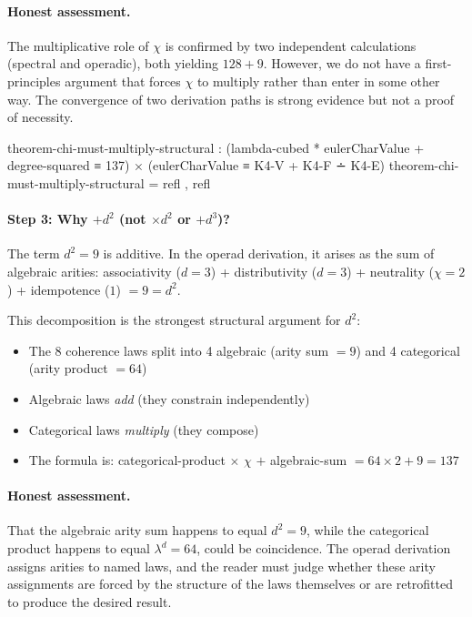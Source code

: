 \documentclass[11pt,a4paper]{book}
\begin{document}
\paragraph{Honest assessment.} The multiplicative role of $\chi$ is confirmed by
two independent calculations (spectral and operadic), both yielding $128 + 9$.
However, we do not have a first-principles argument that forces $\chi$ to multiply
rather than enter in some other way. The convergence of two derivation paths is
strong evidence but not a proof of necessity.

\begin{code}
theorem-chi-must-multiply-structural : 
  (lambda-cubed * eulerCharValue + degree-squared ≡ 137) ×
  (eulerCharValue ≡ K4-V + K4-F ∸ K4-E)
theorem-chi-must-multiply-structural = refl , refl
\end{code}

\paragraph{Step 3: Why $+ d^2$ (not $\times d^2$ or $+ d^3$)?}

The term $d^2 = 9$ is additive. In the operad derivation, it arises as the sum of
algebraic arities: associativity ($d=3$) + distributivity ($d=3$) + neutrality ($\chi=2$)
+ idempotence ($1$) $= 9 = d^2$.

This decomposition is the strongest structural argument for $d^2$:
\begin{itemize}
\item The 8 coherence laws split into 4 algebraic (arity sum $= 9$) and
  4 categorical (arity product $= 64$)
\item Algebraic laws \emph{add} (they constrain independently)
\item Categorical laws \emph{multiply} (they compose)
\item The formula is: categorical-product $\times$ $\chi$ $+$ algebraic-sum
  $= 64 \times 2 + 9 = 137$
\end{itemize}

\paragraph{Honest assessment.} That the algebraic arity sum happens to equal $d^2 = 9$,
while the categorical product happens to equal $\lambda^d = 64$, could be coincidence.
The operad derivation assigns arities to named laws, and the reader must judge whether
these arity assignments are forced by the structure of the laws themselves or are
retrofitted to produce the desired result.
\end{document}
